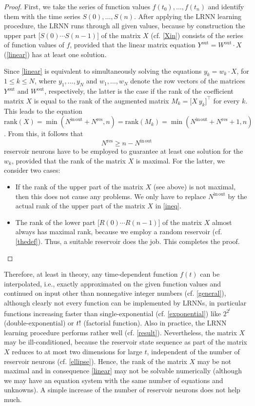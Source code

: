 \documentclass[twoside,11pt]{article}
\theoremstyle{definition}
\begin{document}
\begin{proof}
First, we take the series of function values $f(t_0),\dots,f(t_n)$ and identify
them with the time series $S(0),\dots,S(n)$. After applying the LRNN learning
procedure, the LRNN runs through all given values, because by construction the
upper part $\big[ S(0) \cdots S(n-1) \big]$ of the matrix $X$ (cf. \cref{Xin})
consists of the series of function values of $f$, provided that the linear
matrix equation $Y^\mathrm{out} = W^\mathrm{out} \cdot X$ (\cref{linear}) has at
least one solution.

Since \cref{linear} is equivalent to simultaneously solving the equations $y_k =
w_k \cdot X$, for $1 \le k \le N$, where $y_1,\dots,y_N$ and $w_1,\dots,w_N$
denote the row vectors of the matrices $Y^\mathrm{out}$ and $W^\mathrm{out}$,
respectively, the latter is the case if the rank of the coefficient matrix $X$
is equal to the rank of the augmented matrix $M_k = \big[ X ~ y_k \big]^\top$
for every $k$. This leads to the equation $\mathrm{rank}(X) =
\min(N^\mathrm{in\,out}+N^\mathrm{res},n) = \mathrm{rank}(M_k) =
\min(N^\mathrm{in\,out}+N^\mathrm{res}+1,n)$. From this, it follows that
\begin{equation}\label{ineq}
	N^\mathrm{res} \ge n-N^\mathrm{in\,out}
\end{equation}
reservoir neurons have to be employed to guarantee at least one solution for the
$w_k$, provided that the rank of the matrix $X$ is maximal. For the latter, we
consider two cases:
\begin{itemize}
  \item If the rank of the upper part of the matrix $X$ (see above) is not
	maximal, then this does not cause any problems. We only have to replace
	$N^\mathrm{in\,out}$ by the actual rank of the upper part of the matrix
	$X$ in \cref{ineq}.
  \item The rank of the lower part $\big[ R(0) \cdots R(n-1) \big]$ of the
	matrix $X$ almost always has maximal rank, because we employ a random
	reservoir (cf. \cref{thedef}). Thus, a suitable reservoir does the job.
	This completes the proof. \qedhere
\end{itemize}
\end{proof}

Therefore, at least in theory, any time-dependent function $f(t)$ can be
interpolated, i.e., exactly approximated on the given function values and
continued on input other than nonnegative integer numbers (cf. \cref{general}),
although clearly not every function can be implemented by LRNNs, in particular
functions increasing faster than single-exponential (cf. \cref{exponential})
like $2^{2^t}$ (double-exponential) or $t\/!$ (factorial function). Also in
practice, the LRNN learning procedure performs rather well (cf. \cref{result}).
Nevertheless, the matrix $X$ may be ill-conditioned, because the reservoir state
sequence as part of the matrix $X$ reduces to at most two dimensions for large
$t$, independent of the number of reservoir neurons (cf. \cref{ellipse}). Hence,
the rank of the matrix $X$ may be not maximal and in consequence \cref{linear}
may not be solvable numerically (although we may have an equation system with
the same number of equations and unknowns). A simple increase of the number of
reservoir neurons does not help much.
\end{document}
